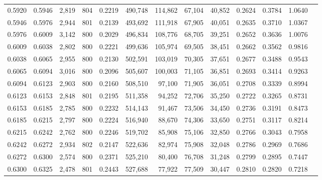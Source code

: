 \begin{tabular}{rrrrrrrrrrrrr}
0.5920 & 0.5946 &  2,819 & 804 &                                     0.2219 & 490,748 & 114,862 &  67,104 &  40,852 & 0.2624 & 0.3784 & 1.0640 \\
0.5946 & 0.5976 &  2,944 & 801 &                                     0.2139 & 493,692 & 111,918 &  67,905 &  40,051 & 0.2635 & 0.3710 & 1.0367 \\
0.5976 & 0.6009 &  3,142 & 800 &                                     0.2029 & 496,834 & 108,776 &  68,705 &  39,251 & 0.2652 & 0.3636 & 1.0076 \\
0.6009 & 0.6038 &  2,802 & 800 &                                     0.2221 & 499,636 & 105,974 &  69,505 &  38,451 & 0.2662 & 0.3562 & 0.9816 \\
0.6038 & 0.6065 &  2,955 & 800 &                                     0.2130 & 502,591 & 103,019 &  70,305 &  37,651 & 0.2677 & 0.3488 & 0.9543 \\
0.6065 & 0.6094 &  3,016 & 800 &                                     0.2096 & 505,607 & 100,003 &  71,105 &  36,851 & 0.2693 & 0.3414 & 0.9263 \\
0.6094 & 0.6123 &  2,903 & 800 &                                     0.2160 & 508,510 &  97,100 &  71,905 &  36,051 & 0.2708 & 0.3339 & 0.8994 \\
0.6123 & 0.6153 &  2,848 & 801 &                                     0.2195 & 511,358 &  94,252 &  72,706 &  35,250 & 0.2722 & 0.3265 & 0.8731 \\
0.6153 & 0.6185 &  2,785 & 800 &                                     0.2232 & 514,143 &  91,467 &  73,506 &  34,450 & 0.2736 & 0.3191 & 0.8473 \\
0.6185 & 0.6215 &  2,797 & 800 &                                     0.2224 & 516,940 &  88,670 &  74,306 &  33,650 & 0.2751 & 0.3117 & 0.8214 \\
0.6215 & 0.6242 &  2,762 & 800 &                                     0.2246 & 519,702 &  85,908 &  75,106 &  32,850 & 0.2766 & 0.3043 & 0.7958 \\
0.6242 & 0.6272 &  2,934 & 802 &                                     0.2147 & 522,636 &  82,974 &  75,908 &  32,048 & 0.2786 & 0.2969 & 0.7686 \\
0.6272 & 0.6300 &  2,574 & 800 &                                     0.2371 & 525,210 &  80,400 &  76,708 &  31,248 & 0.2799 & 0.2895 & 0.7447 \\
0.6300 & 0.6325 &  2,478 & 801 &                                     0.2443 & 527,688 &  77,922 &  77,509 &  30,447 & 0.2810 & 0.2820 & 0.7218 \\

\end{tabular}
